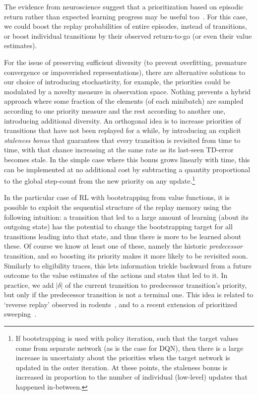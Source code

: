 \documentclass[a4paper]{article}
\begin{document}
The evidence from neuroscience suggest that a prioritization based on episodic return rather than expected learning progress may be useful too~\cite{dharsh1,dharsh2,dharsh3}. For this case, we could boost the replay probabilities of entire episodes, instead of transitions, or boost individual transitions by their observed return-to-go (or even their value estimates).


For the issue of preserving sufficient diversity (to prevent overfitting, premature convergence or impoverished representations), 
there are alternative solutions 
to our choice of introducing stochasticity, for example, the priorities could be modulated
by a novelty measure in observation space. 
Nothing prevents a hybrid approach where some fraction of the elements (of each minibatch) are sampled according to one priority measure and the rest according to another one, introducing additional diversity.
An orthogonal idea is to increase priorities of transitions that have not been 
replayed for a while, by introducing an explicit \emph{staleness bonus} that guarantees that every transition 
is revisited from time to time, with that chance increasing at the same rate as its last-seen
TD-error becomes stale.
In the simple case where this bonus grows linearly with time, 
this can be implemented at no additional cost by subtracting a quantity proportional to the global step-count from the new priority on any update.\footnote{
If bootstrapping is used with policy iteration, such that the target values come from separate network (as is the case for DQN), 
then there is a large increase in uncertainty about the priorities when the target network is updated in the outer iteration.
At these points, the staleness bonus is increased in proportion to the number of individual (low-level) updates
that happened in-between.
}



In the particular case of RL with bootstrapping from value functions, it is possible to exploit the sequential structure 
of the replay memory using the following intuition:
a transition that led to a large amount of learning (about its outgoing state) 
has the potential to change the bootstrapping target for all transitions leading into that state, and
thus there is more to be learned about these. 
Of course we know at least one of these, namely the historic \emph{predecessor} transition,
and so boosting its priority makes it more likely to be revisited soon.
Similarly to eligibility traces, this lets information trickle backward from a future outcome to
the value estimates of the actions and states that led to it.
In practice, we add $|\delta|$ of the current transition to predecessor transition's priority, but only if the predecessor transition
is not a terminal one. This idea is related to `reverse replay' observed in rodents~\cite{dharsh3}, and to a recent extension of prioritized sweeping~\citep{harm}.
\end{document}
